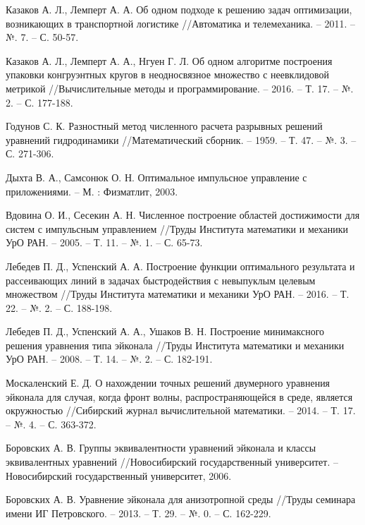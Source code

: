 \pagebreak
\begin{thebibliography}{99}


Казаков А. Л., Лемперт А. А. Об одном подходе к
  решению задач оптимизации, возникающих в транспортной логистике
  //Автоматика и телемеханика. – 2011. – №. 7. – С. 50-57.

Казаков А. Л., Лемперт А. А., Нгуен Г. Л. Об одном
  алгоритме построения упаковки конгруэнтных кругов в неодносвязное
  множество с неевклидовой метрикой //Вычислительные методы и
  программирование. – 2016. – Т. 17. – №. 2. – С. 177-188.

Годунов С. К. Разностный метод численного расчета
  разрывных решений уравнений гидродинамики //Математический
  сборник. – 1959. – Т. 47. – №. 3. – С. 271-306.
  
Дыхта В. А., Самсонюк О. Н. Оптимальное импульсное
  управление с приложениями. – М. : Физматлит, 2003.

 Вдовина О. И., Сесекин А. Н. Численное построение
  областей достижимости для систем с импульсным управлением //Труды
  Института математики и механики УрО РАН. – 2005. – Т. 11. – №. 1. –
  С. 65-73.

 Лебедев П. Д., Успенский А. А. Построение функции
  оптимального результата и рассеивающих линий в задачах
  быстродействия с невыпуклым целевым множеством //Труды Института
  математики и механики УрО РАН. – 2016. – Т. 22. – №. 2. –
  С. 188-198.

  
 Лебедев П. Д., Успенский А. А., Ушаков
  В. Н. Построение минимаксного решения уравнения типа эйконала
  //Труды Института математики и механики УрО РАН. – 2008. – Т. 14. –
  №. 2. – С. 182-191.
  
Москаленский Е. Д. О нахождении точных решений
  двумерного уравнения эйконала для случая, когда фронт волны,
  распространяющейся в среде, является окружностью //Сибирский журнал
  вычислительной математики. – 2014. – Т. 17. – №. 4. – С. 363-372.

 Боровских А. В. Группы эквивалентности уравнений
  эйконала и классы эквивалентных уравнений //Новосибирский
  государственный университет. – Новосибирский государственный
  университет, 2006.

 Боровских А. В. Уравнение эйконала для анизотропной
  среды //Труды семинара имени ИГ Петровского. – 2013. – Т. 29. –
  №. 0. – С. 162-229.


\end{thebibliography}
